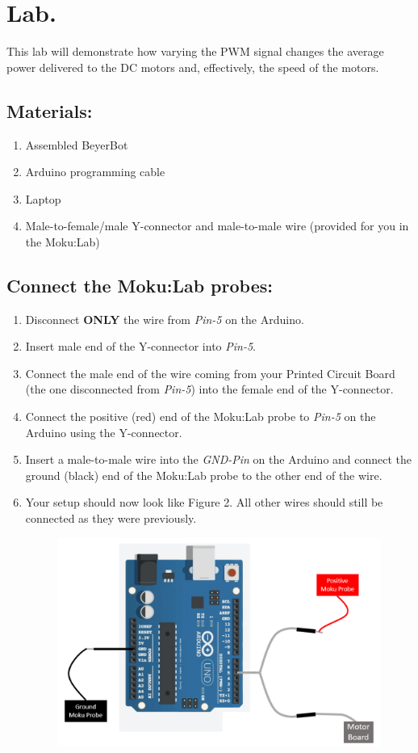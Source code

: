 \documentclass{handout}
\begin{document}
	\section{Lab.}
	This lab will demonstrate how varying the PWM signal changes the average power delivered to the DC motors and, effectively, the speed of the motors.
	
	\subsection{Materials:}
	
	\begin{enumerate}
		\item Assembled BeyerBot
		\item Arduino programming cable
		\item Laptop
		\item Male-to-female/male Y-connector and male-to-male wire (provided for you in the Moku:Lab)
	\end{enumerate}

	\subsection{Connect the Moku:Lab probes:}
	\begin{enumerate}
		\item Disconnect \textbf{ONLY} the wire from \textit{Pin-5} on the Arduino.
		\item Insert male end of the Y-connector into \textit{Pin-5}.
		\item Connect the male end of the wire coming from your Printed Circuit Board (the one disconnected from \textit{Pin-5}) into the female end of the Y-connector.
		\item Connect the positive (red) end of the Moku:Lab probe to \textit{Pin-5} on the Arduino using the Y-connector.
		\item Insert a male-to-male wire into the \textit{GND-Pin} on the Arduino and connect the ground (black) end of the Moku:Lab probe to the other end of the wire.
		\item Your setup should now look like Figure 2. All other wires should still be connected as they were previously.
		\begin{figure} [H]
			\centering
			\includegraphics[width=.75\textwidth]{Figure4.PNG}
			\caption{}
		\end{figure}
	\end{enumerate}
	
\end{document}
